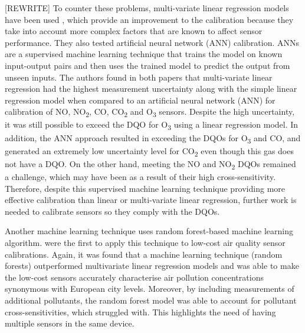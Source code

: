 \documentclass[11pt,twosided,a4paper]{report}
\begin{document}
[REWRITE] To counter these problems, multi-variate linear regression models have been used \citep{Spinelle2015fieldcalibrationa,Spinelle2017fieldcalibrationb}, which provide an improvement to the calibration because they take into account more complex factors that are known to affect sensor performance. They also tested artificial neural network (ANN) calibration. ANNs are a supervised machine learning technique that trains the model on known input-output pairs and then uses the trained model to predict the output from unseen inputs. The authors found in both papers that multi-variate linear regression had the highest measurement uncertainty along with the simple linear regression model when compared to an artificial neural network (ANN) for calibration of NO, NO\textsubscript{2}, CO, CO\textsubscript{2} and O\textsubscript{3} sensors. Despite the high uncertainty, it was still possible to exceed the DQO for O\textsubscript{3} using a linear regression model. In addition, the ANN approach resulted in exceeding the DQOs for O\textsubscript{3} and CO, and generated an extremely low uncertainty level for CO\textsubscript{2} even though this gas does not have a DQO. On the other hand, meeting the NO and NO\textsubscript{2} DQOs remained a challenge, which may have been as a result of their high cross-sensitivity. Therefore, despite this supervised machine learning technique providing more effective calibration than linear or multi-variate linear regression, further work is needed to calibrate sensors so they comply with the DQOs.



Another machine learning technique uses random forest-based machine learning algorithm. \cite{zimmerman2018machinelearning} were the first to apply this technique to low-cost air quality sensor calibrations. Again, it was found that a machine learning technique (random forests) outperformed multivariate linear regression models and was able to make the low-cost sensors accurately characterise air pollution concentrations synonymous with European city levels. Moreover, by including measurements of additional pollutants, the random forest model was able to account for pollutant cross-sensitivities, which \cite{Spinelle2015fieldcalibrationa,Spinelle2017fieldcalibrationb} struggled with. This highlights the need of having multiple sensors in the same device.
\end{document}
